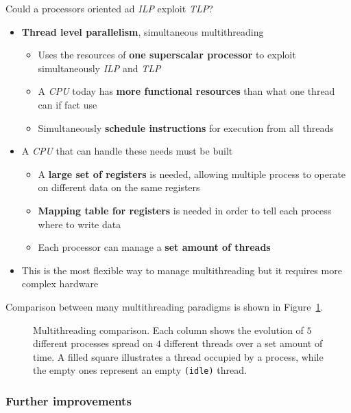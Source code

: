 \documentclass[english]{article}
\begin{document}
\bigskip
Could a processors oriented ad \textit{ILP} exploit \textit{TLP}?

\begin{itemize}
  \item \textbf{Thread level parallelism}, simultaneous multithreading
        \begin{itemize}
          \item Uses the resources of \textbf{one superscalar processor} to exploit simultaneously \textit{ILP} and \textit{TLP}
          \item A \textit{CPU} today has \textbf{more functional resources} than what one thread can if fact use
          \item Simultaneously \textbf{schedule instructions} for execution from all threads
        \end{itemize}
  \item A \textit{CPU} that can handle these needs must be built
        \begin{itemize}
          \item A \textbf{large set of registers} is needed, allowing multiple process to operate on different data on the same registers
          \item \textbf{Mapping table for registers} is needed in order to tell each process where to write data
          \item Each processor can manage a \textbf{set amount of threads}
        \end{itemize}
  \item This is the most flexible way to manage multithreading but it requires more complex hardware
\end{itemize}
\bigskip

Comparison between many multithreading paradigms is shown in Figure~\ref{fig:multithreading-comparison}.

\begin{figure}[htbp]
  \bigskip
  \centering
  \caption{\centering Multithreading comparison. Each column shows the evolution of \(5\) different processes spread on \(4\) different threads over a set amount of time.
    A filled square illustrates a thread occupied by a process, while the empty ones represent an empty \texttt{(idle)} thread.}
  \label{fig:multithreading-comparison}
  \bigskip
\end{figure}

\subsubsection{Further improvements}
\end{document}
